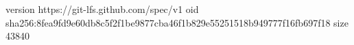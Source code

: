 version https://git-lfs.github.com/spec/v1
oid sha256:8fea9fd9e60db8c5f2f1be9877cba46f1b829e55251518b949777f16fb697f18
size 43840
